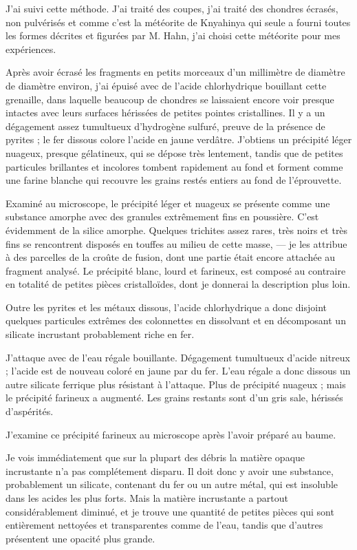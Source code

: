 \documentclass[a4paper, 12pt, oneside, french]{book}
\begin{document}
J'ai suivi cette méthode. J'ai traité des coupes, j'ai traité des chondres écrasés, non pulvérisés et comme c'est la météorite de Knyahinya qui seule a fourni toutes les formes décrites et figurées par M. Hahn, j'ai choisi cette météorite pour mes expériences.

Après avoir écrasé les fragments en petits morceaux d'un millimètre de diamètre de diamètre environ, j'ai épuisé avec de l'acide chlorhydrique bouillant cette grenaille, dans laquelle beaucoup de chondres se laissaient encore voir presque intactes avec leurs surfaces hérissées de petites pointes cristallines. Il y a un dégagement assez tumultueux d'hydrogène sulfuré, preuve de la présence de pyrites ; le fer dissous colore l'acide en jaune verdâtre. J'obtiens un précipité léger nuageux, presque gélatineux, qui se dépose très lentement, tandis que de petites particules brillantes et incolores tombent rapidement au fond et forment comme une farine blanche qui recouvre les grains restés entiers au fond de l'éprouvette.

Examiné au microscope, le précipité léger et nuageux se présente comme une substance amorphe avec des granules extrêmement fins en poussière. C'est évidemment de la silice amorphe. Quelques trichites assez rares, très noirs et très fins se rencontrent disposés en touffes au milieu de cette masse, --- je les attribue à des parcelles de la croûte de fusion, dont une partie était encore attachée au fragment analysé. Le précipité blanc, lourd et farineux, est composé au contraire en totalité de petites pièces cristalloïdes, dont je donnerai la description plus loin.

Outre les pyrites et les métaux dissous, l'acide chlorhydrique a donc disjoint quelques particules extrêmes des colonnettes en dissolvant et en décomposant un silicate incrustant probablement riche en fer.

J'attaque avec de l'eau régale bouillante. Dégagement tumultueux d'acide nitreux ; l'acide est de nouveau coloré en jaune par du fer. L'eau régale a donc dissous un autre silicate ferrique plus résistant à l'attaque. Plus de précipité nuageux ; mais le précipité farineux a augmenté. Les grains restants sont d'un gris sale, hérissés d'aspérités.

J'examine ce précipité farineux au microscope après l'avoir préparé au baume.

Je vois immédiatement que sur la plupart des débris la matière opaque incrustante n'a pas complétement disparu. Il doit donc y avoir une substance, probablement un silicate, contenant du fer ou un autre métal, qui est insoluble dans les acides les plus forts. Mais la matière incrustante a partout considérablement diminué, et je trouve une quantité de petites pièces qui sont entièrement nettoyées et transparentes comme de l'eau, tandis que d'autres présentent une opacité plus grande.
\end{document}
